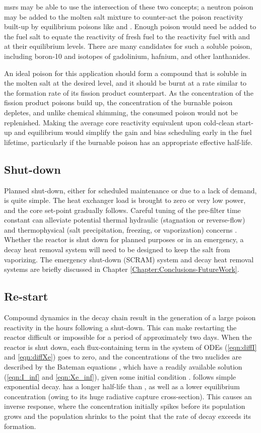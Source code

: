\acsp{msr} may be able to use the intersection of these two concepts; a neutron poison may be added to the molten salt mixture to counter-act the poison reactivity built-up by equilibrium poisons like \Xe and \Sm. Enough poison would need be added to the fuel salt to equate the reactivity of fresh fuel to the reactivity fuel with \Xe and \Sm at their equilibrium levels. There are many candidates for such a soluble poison, including boron-10 and isotopes of gadolinium, hafnium, and other lanthanides.

An ideal poison for this application should form a compound that is soluble in the molten salt at the desired level, and it should be burnt at a rate similar to the formation rate of its fission product counterpart. As the concentration of the fission product poisons build up, the concentration of the burnable poison depletes, and unlike chemical shimming, the consumed poison would not be replenished. Making the average core reactivity equivalent upon cold-clean start-up and equilibrium would simplify the gain and bias scheduling early in the fuel lifetime, particularly if the burnable poison has an appropriate effective half-life.

\subsection{Shut-down}
Planned shut-down, either for scheduled maintenance or due to a lack of demand, is quite simple. The heat exchanger load is brought to zero or very low power, and the core set-point gradually follows. Careful tuning of the pre-filter time constant can alleviate potential thermal hydraulic (\eg stagnation or reverse-flow) and thermophysical (\eg salt precipitation, freezing, or vaporization) concerns \cite{CarterNumerical}. Whether the reactor is shut down for planned purposes or in an emergency, a decay heat \cite{TodreasKazimi1} removal system will need to be designed to keep the salt from vaporizing. The emergency shut-down (SCRAM) system and decay heat removal systems are briefly discussed in Chapter \ref{Chapter:Conclusions-FutureWork}.  

\subsection{Re-start}
Compound dynamics in the \Xe decay chain result in the generation of a large poison reactivity in the hours following a shut-down. This can make restarting the reactor difficult or impossible for a period of approximately two days. When the reactor is shut down, each flux-containing term in the system of ODEs (\ref{eqn:diffI} and \ref{eqn:diffXe}) goes to zero, and the concentrations of the two nuclides are described by the Bateman equations \cite{Bateman}, which have a readily available solution (\ref{eqn:I_inf} and \ref{eqn:Xe_inf}), given some initial condition \cite{Lamarsh}. \I follows simple exponential decay. \Xe has a longer half-life than \I, as well as a lower equilibrium concentration (owing to its huge radiative capture cross-section). This causes an inverse response, where the \Xe concentration initially spikes before its population grows and the \I population shrinks to the point that the rate of \Xe decay exceeds its formation. 

